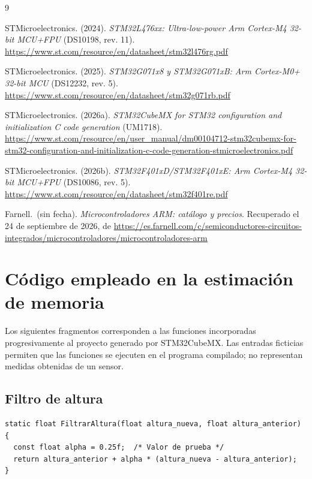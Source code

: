 \documentclass[11pt,a4paper]{article}
\begin{document}
\begin{thebibliography}{9}
\raggedright{}

STMicroelectronics. (2024).
\textit{STM32L476xx: Ultra-low-power Arm Cortex-M4 32-bit MCU+FPU}
(DS10198, rev. 11).
\url{https://www.st.com/resource/en/datasheet/stm32l476rg.pdf}

STMicroelectronics. (2025).
\textit{STM32G071x\mbox{8} y STM32G071xB\@: Arm Cortex-M0+ 32-bit MCU}
(DS12232, rev. 5).
\url{https://www.st.com/resource/en/datasheet/stm32g071rb.pdf}

STMicroelectronics. (2026a).
\textit{STM32CubeMX for STM32 configuration and initialization
C code generation} (UM1718).
\url{https://www.st.com/resource/en/user_manual/dm00104712-stm32cubemx-for-stm32-configuration-and-initialization-c-code-generation-stmicroelectronics.pdf}

STMicroelectronics. (2026b).
\textit{STM32F401xD/STM32F401xE\@: Arm Cortex-M4 32-bit MCU+FPU}
(DS10086, rev. 5).
\url{https://www.st.com/resource/en/datasheet/stm32f401re.pdf}

Farnell.\ (sin fecha).
\textit{Microcontroladores ARM\@: catálogo y precios}.
Recuperado el 24 de septiembre de 2026, de
\url{https://es.farnell.com/c/semiconductores-circuitos-integrados/microcontroladores/microcontroladores-arm}

\end{thebibliography}
\newpage
\appendix

\section{Código empleado en la estimación de memoria}%
\label{anexo:estimacion_flash}

Los siguientes fragmentos corresponden a las funciones incorporadas
progresivamente al proyecto generado por STM32CubeMX\@. Las entradas
ficticias permiten que las funciones se ejecuten en el programa compilado;
no representan medidas obtenidas de un sensor.

\subsection{Filtro de altura}

\begin{lstlisting}[caption={Filtro exponencial utilizado en la prueba.},
label={lst:filtro_altura}]
static float FiltrarAltura(float altura_nueva, float altura_anterior)
{
  const float alpha = 0.25f;  /* Valor de prueba */
  return altura_anterior + alpha * (altura_nueva - altura_anterior);
}
\end{lstlisting}
\end{document}
